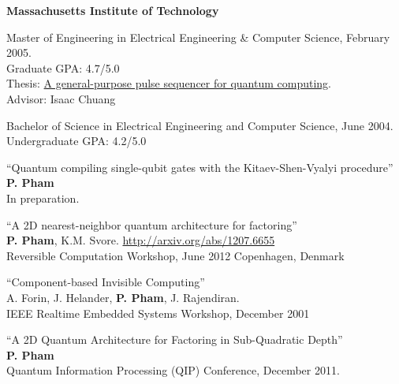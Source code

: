 \documentclass[letter]{article}
\begin{document}
{\bf Massachusetts Institute of Technology}
\par
Master of Engineering in Electrical Engineering \& Computer Science, February 2005.\\
Graduate GPA: 4.7/5.0\\
Thesis: \href{http://sourceforge.net/project/showfiles.php?group_id=129764&package_id=144780&release_id=307201}{A general-purpose pulse sequencer for quantum computing}.\\
Advisor: Isaac Chuang\\
\par
Bachelor of Science in Electrical Engineering and Computer Science, June 2004.\\
Undergraduate GPA: 4.2/5.0
\vspace{\baselineskip}
\par

\vspace{\baselineskip}
\par
``Quantum compiling single-qubit gates with the Kitaev-Shen-Vyalyi procedure''
\\
\textbf{P. Pham}\\
In preparation.

\vspace{\baselineskip}
\par
``A 2D nearest-neighbor quantum architecture for factoring''\\
\textbf{P. Pham}, K.M. Svore. \hfill \url{http://arxiv.org/abs/1207.6655}\\
Reversible Computation Workshop, June 2012 \hfill Copenhagen, Denmark\\

\vspace{\baselineskip}
\par
``Component-based Invisible Computing''\\
A. Forin, J. Helander, \textbf{P. Pham}, J. Rajendiran.\\
IEEE Realtime Embedded Systems Workshop, December 2001 \hfill 

\vspace{\baselineskip}
\par
``A 2D Quantum Architecture for Factoring in Sub-Quadratic Depth''
\\
\textbf{P. Pham}\\
Quantum Information Processing (QIP) Conference, December 2011.
\end{document}
